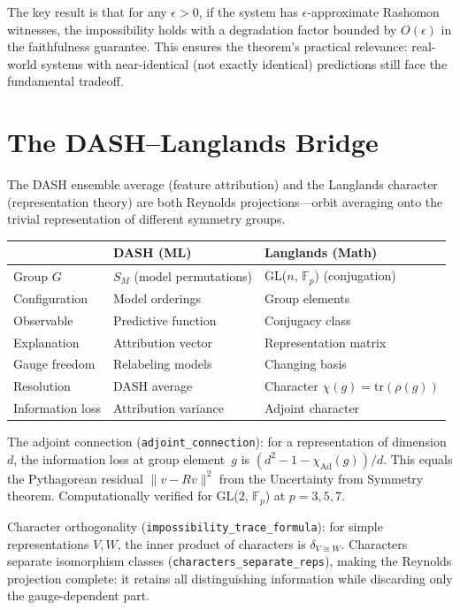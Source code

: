 \documentclass[11pt]{article}
\begin{document}
The key result is that for any $\epsilon > 0$, if the system has $\epsilon$-approximate Rashomon witnesses, the impossibility holds with a degradation factor bounded by $O(\epsilon)$ in the faithfulness guarantee.  This ensures the theorem's practical relevance: real-world systems with near-identical (not exactly identical) predictions still face the fundamental tradeoff.

\section{The DASH--Langlands Bridge}
\label{sec:dash-langlands}

The DASH ensemble average (feature attribution) and the Langlands character (representation theory) are both Reynolds projections---orbit averaging onto the trivial representation of different symmetry groups.

\begin{center}
\small
\begin{tabular}{@{}lll@{}}
\toprule
& \textbf{DASH (ML)} & \textbf{Langlands (Math)} \\
\midrule
Group $G$ & $S_M$ (model permutations) & GL($n$, $\mathbb{F}_p$) (conjugation) \\
Configuration & Model orderings & Group elements \\
Observable & Predictive function & Conjugacy class \\
Explanation & Attribution vector & Representation matrix \\
Gauge freedom & Relabeling models & Changing basis \\
Resolution & DASH average & Character $\chi(g) = \mathrm{tr}(\rho(g))$ \\
Information loss & Attribution variance & Adjoint character \\
\bottomrule
\end{tabular}
\end{center}

The adjoint connection (\texttt{adjoint\_connection}): for a representation of dimension~$d$, the information loss at group element~$g$ is $(d^2 - 1 - \chi_{\mathrm{Ad}}(g))/d$.  This equals the Pythagorean residual $\|v - Rv\|^2$ from the Uncertainty from Symmetry theorem.  Computationally verified for GL($2$, $\mathbb{F}_p$) at $p = 3, 5, 7$.

Character orthogonality (\texttt{impossibility\_trace\_formula}): for simple representations $V, W$, the inner product of characters is $\delta_{V \cong W}$.  Characters separate isomorphism classes (\texttt{characters\_separate\_reps}), making the Reynolds projection complete: it retains all distinguishing information while discarding only the gauge-dependent part.
\end{document}
